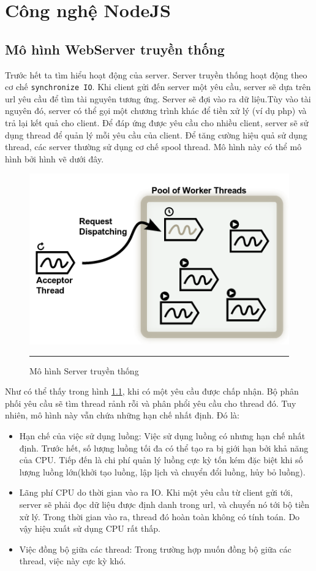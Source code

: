 ﻿\chapter{Công nghệ NodeJS}
\label{Công nghệ NodeJS}

\section{Mô hình WebServer truyền thống}
    Trước hết ta tìm hiểu hoạt động của server.  Server truyền thống hoạt động theo cơ chế \texttt{synchronize IO}. Khi client gửi đến server một yêu cầu, server sẽ dựa trên url yêu cầu để tìm tài nguyên tương ứng. Server sẽ đợi vào ra dữ liệu.Tùy vào tài nguyên đó, server có thể gọi một chương trình khác để tiền xử lý (ví dụ php) và trả lại kết quả cho client. Để đáp ứng được yêu cầu cho nhiều client, server sẽ sử dụng thread để quản lý mỗi yêu cầu của client. Để tăng cường hiệu quả sử dụng thread, các server thường sử dụng cơ chế spool thread. Mô hình này có thể mô hình bởi hình vẽ dưới đây. \\
	\begin{figure}
        \centering
        \includegraphics[scale=0.7]{io}
        \rule{35em}{0.5pt}
        \caption{Mô hình Server truyền thống}
        \label{fig:io}
    \end{figure}
	Như có thể thấy trong hình \ref{fig:io}, khi có một yêu cầu được chấp nhận. Bộ phân phối yêu cầu sẽ tìm thread rảnh rỗi và phân phổi yêu cầu cho thread đó.
	Tuy nhiên, mô hình này vẫn chứa những hạn chế nhất định. Đó là: \\
	\begin{itemize}
		\item Hạn chế của  việc sử dụng luồng: Việc sử dụng luồng có nhưng hạn chế nhất định. Trước hết, số lượng luồng tối đa có thể tạo ra bị giới hạn bởi khả năng của CPU. Tiếp đến là chi phí quản lý luồng cực kỳ tốn kém đặc biệt khi số lượng luồng lớn(khởi tạo luồng, lập lịch và chuyển đổi luồng, hủy bỏ luồng).
		\item Lãng phí CPU do thời gian vào ra IO. Khi một yêu cầu từ client gửi tới, server sẽ phải đọc dữ liệu được định danh trong url, và chuyển nó tới bộ tiền xử lý. Trong thời gian vào ra, thread đó hoàn toàn không có tính toán. Do vậy hiệu xuất sử dụng CPU rất thấp.
		\item Việc đồng bộ giữa các thread: Trong trường hợp  muốn đồng bộ giữa các thread, việc này cực kỳ khó.
	\end{itemize}

